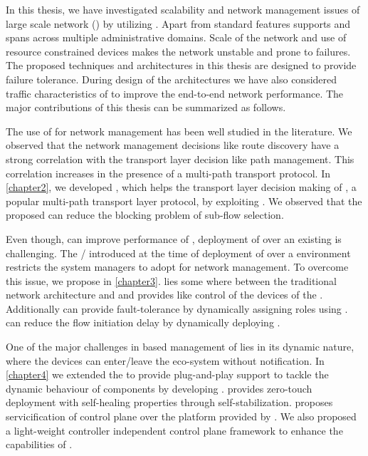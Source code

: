 In this thesis, we have investigated scalability and network management issues of large scale  network () by utilizing . Apart from standard  features  supports  and spans across multiple administrative domains. Scale of the network and use of resource constrained  devices makes the network unstable and prone to failures. The proposed techniques and architectures in this thesis are designed to provide failure tolerance. During design of the architectures we have also considered traffic characteristics of  to improve the end-to-end network performance. The major contributions of this thesis can be summarized as follows.

The use of  for network management has been well studied in the literature. We observed that the network management decisions like route discovery have a strong correlation with the transport layer decision like path management. This correlation increases in the presence of a multi-path transport protocol. In \cref{chapter2}, we developed , which helps the transport layer decision making of , a popular multi-path transport layer protocol, by exploiting . We observed that the proposed  can reduce the  blocking problem of  sub-flow selection.

Even though,  can improve performance of , deployment of  over an existing  is challenging. The / introduced at the time of deployment of  over a  environment restricts the system managers to adopt  for network management. To overcome this issue, we propose  in \cref{chapter3}.  lies some where between the traditional network architecture and  and provides  like control of the  devices of the . Additionally  can provide fault-tolerance by dynamically assigning roles using .  can reduce the flow initiation delay by dynamically deploying .

One of the major challenges in  based management of  lies in its dynamic nature, where the devices can enter/leave the eco-system without notification. In \cref{chapter4} we extended the  to provide plug-and-play support to tackle the dynamic behaviour of  components by developing .  provides zero-touch deployment with self-healing properties through self-stabilization.  proposes servicification of control plane over the  platform provided by . We also proposed a light-weight controller independent control plane framework to enhance the capabilities of .

